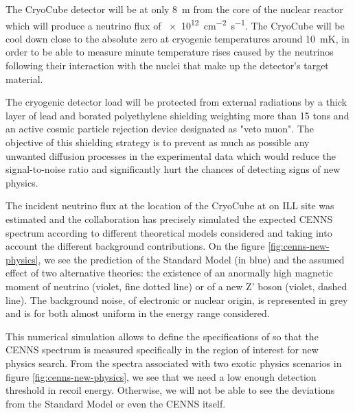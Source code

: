 The CryoCube detector will be at only \SI{8}{\m} from the core of the nuclear reactor which will produce a neutrino flux of \SI{e12}{\cm^{-2} \s^{-1}}. The CryoCube will be cool down close to the absolute zero at cryogenic temperatures around \SI{10}{\milli\kelvin}, in order to be able to measure minute temperature rises caused by the neutrinos following their interaction with the nuclei that make up the detector's target material.

The cryogenic detector load will be protected from external radiations by a thick layer of lead and borated polyethylene shielding weighting more than 15 tons and an active cosmic particle rejection device designated as "veto muon". The objective of this shielding strategy is to prevent as much as possible any unwanted diffusion processes in the experimental data which would reduce the signal-to-noise ratio and significantly hurt the chances of detecting signs of new physics.

The incident neutrino flux at the location of the CryoCube at on ILL site was estimated and
the collaboration has precisely simulated the expected CENNS spectrum according to different theoretical models considered and taking into account the different background contributions. On the figure \ref{fig:cenns-new-physics}, we see the prediction of the Standard Model (in blue) and the assumed effect of two alternative theories: the existence of an anormally high magnetic moment of neutrino (violet, fine dotted line) or of a new Z' boson (violet, dashed line). The background noise, of electronic or nuclear origin, is represented in grey and is for both almost uniform in the energy range considered.

This numerical simulation allows to define the specifications of \Ricochet{} so that the CENNS spectrum is measured specifically in the region of interest for new physics search. From the spectra associated with two exotic physics scenarios in figure \ref{fig:cenns-new-physics}, we see that we need a low enough detection threshold in recoil energy. Otherwise, we will not be able to see the deviations from the Standard Model or even the CENNS itself.


